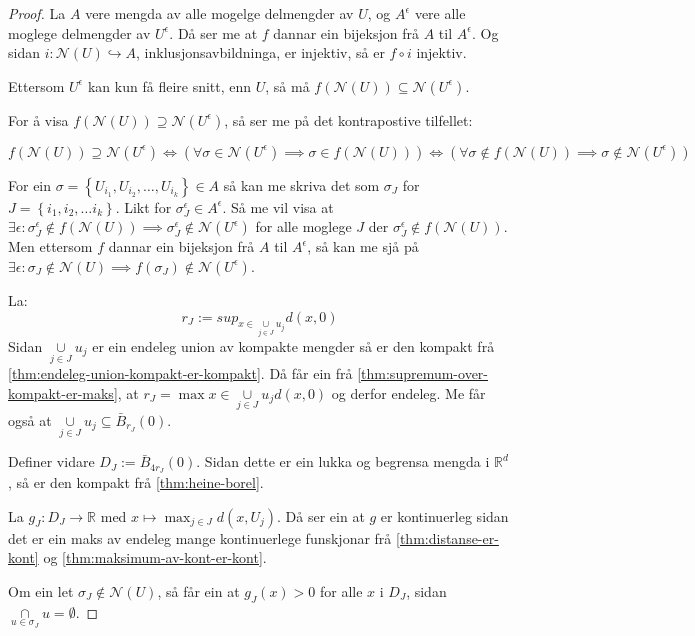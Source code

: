 \documentclass[a4paper, titlepage, 12pt, norsk]{article}
\theoremstyle{plain}
\theoremstyle{definition}
\newcommand{\Rb}{\mathbb{R}}
\newcommand{\Nc}{\mathcal{N}}
\newcommand{\intersect}{ \mathop{\cap}\limits } %
\newcommand{\union}{ \mathop{\cup}\limits }
\newcommand{\set}[1]{ \left \{ #1 \right \} } %
\newcommand{\tuple}[1]{ \left( #1 \right) } %
\begin{document}
\begin{proof}
	La \( A \) vere mengda av alle mogelge delmengder av \( U \), og \( A^\epsilon \) vere alle moglege delmengder av \( U^\epsilon \). Då ser me at \( f \) dannar ein bijeksjon frå \( A \) til \( A^\epsilon \). Og sidan \( i: \Nc(U) \hookrightarrow A \), inklusjonsavbildninga, er injektiv, så er \( f \circ i \) injektiv.

	Ettersom \( U^{\epsilon} \) kan kun få fleire snitt, enn \( U \), så må \( f(\Nc(U)) \subseteq \Nc(U^{\epsilon}) \).
	
	For å visa \( f(\Nc(U)) \supseteq \Nc(U^{\epsilon}) \), så ser me på det kontrapostive tilfellet:
	 
	\[ 
		f(\Nc(U)) \supseteq \Nc(U^{\epsilon}) \iff \tuple{\forall \sigma \in \Nc(U^{\epsilon}) \implies \sigma \in f(\Nc(U))} \iff \tuple{\forall \sigma \not\in f(\Nc(U)) \implies \sigma \not\in \Nc(U^{\epsilon})}
	\] %

	For ein \( \sigma = \set{U_{i_1}, U_{i_2}, \dots, U_{i_k}} \in A \) så kan me skriva det som \( \sigma_J \) for \( J = \set{i_1, i_2, \dots i_k} \). Likt for \( \sigma^\epsilon_J \in A^\epsilon \). Så me vil visa at \( \exists \epsilon : \sigma^\epsilon_J \not\in f(\Nc(U)) \implies \sigma^\epsilon_J \not\in \Nc(U^{\epsilon}) \) for alle moglege \( J \) der \( \sigma^\epsilon_J \not\in f(\Nc(U)) \). Men ettersom \( f \) dannar ein bijeksjon frå \( A \) til \( A^\epsilon \), så kan me sjå på \( \exists \epsilon : \sigma_J \not\in \Nc(U) \implies f(\sigma_J) \not\in \Nc(U^{\epsilon}) \).

	La:
	\[
		r_J := sup_{x \in \union_{j \in J} u_j} d(x,0)
	\]
	Sidan \( \union_{j \in J} u_j \) er ein endeleg union av kompakte mengder så er den kompakt frå \autoref{thm:endeleg-union-kompakt-er-kompakt}. Då får ein frå \autoref{thm:supremum-over-kompakt-er-maks}, at \( r_J = \max{x \in \union_{j \in J} u_j} d(x,0) \) og derfor endeleg. Me får også at \( \union_{j \in J} u_j \subseteq \bar{B}_{r_J}(0) \).
	
	Definer vidare \( D_J := \bar{B}_{4r_J}(0) \). Sidan dette er ein lukka og begrensa mengda i \( \Rb^d \), så er den kompakt frå \autoref{thm:heine-borel}.

	La \( g_J: D_J \to \Rb \) med \( x \mapsto \max_{j \in J} d(x, U_j) \). Då ser ein at \( g \) er kontinuerleg sidan det er ein maks av endeleg mange kontinuerlege funskjonar frå \autoref{thm:distanse-er-kont} og \autoref{thm:maksimum-av-kont-er-kont}.

	Om ein let \( \sigma_J \not\in \Nc(U) \), så får ein at \( g_J(x) > 0 \) for alle \( x \) i \( D_J \), sidan \( \intersect_{u \in \sigma_J} u = \emptyset \).


\end{proof}
\end{document}
